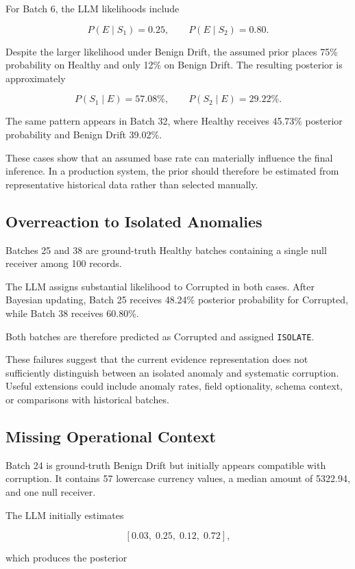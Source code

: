\documentclass{article}
\begin{document}
For Batch 6, the LLM likelihoods include

\[
P(E\mid S_1)=0.25,
\qquad
P(E\mid S_2)=0.80.
\]

Despite the larger likelihood under Benign Drift, the assumed prior places 75\% probability on Healthy and only 12\% on Benign Drift. The resulting posterior is approximately

\[
P(S_1\mid E)=57.08\%,
\qquad
P(S_2\mid E)=29.22\%.
\]

The same pattern appears in Batch 32, where Healthy receives 45.73\% posterior probability and Benign Drift 39.02\%.

These cases show that an assumed base rate can materially influence the final inference. In a production system, the prior should therefore be estimated from representative historical data rather than selected manually.


\subsection{Overreaction to Isolated Anomalies}

Batches 25 and 38 are ground-truth Healthy batches containing a single null receiver among 100 records.

The LLM assigns substantial likelihood to Corrupted in both cases. After Bayesian updating, Batch 25 receives 48.24\% posterior probability for Corrupted, while Batch 38 receives 60.80\%.

Both batches are therefore predicted as Corrupted and assigned \texttt{ISOLATE}.

These failures suggest that the current evidence representation does not sufficiently distinguish between an isolated anomaly and systematic corruption. Useful extensions could include anomaly rates, field optionality, schema context, or comparisons with historical batches.


\subsection{Missing Operational Context}

Batch 24 is ground-truth Benign Drift but initially appears compatible with corruption. It contains 57 lowercase currency values, a median amount of 5322.94, and one null receiver.

The LLM initially estimates

\[
[0.03,\;0.25,\;0.12,\;0.72],
\]

which produces the posterior
\end{document}
